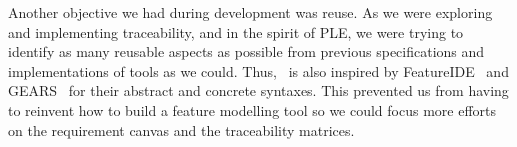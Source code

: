 
Another objective we had during development was reuse. As we were exploring and implementing traceability, and in the spirit of \ac{PLE}, we were trying to identify as many reusable aspects as possible from previous specifications and implementations of tools as we could. Thus, \tool\ is also inspired by FeatureIDE~\cite{kastner2009featureide, thum2014featureide} and GEARS~\cite{GEARS} for their abstract and concrete syntaxes. This prevented us from having to reinvent how to build a feature modelling tool so we could focus more efforts on the requirement canvas and the traceability matrices.


